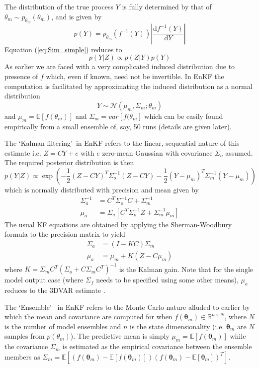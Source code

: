 \documentclass[10pt,a4paper]{article}
\newcommand{\expect} {{\mathbb{E}}}
\newcommand{\thetab} {{\boldsymbol{\theta}}}
\newcommand{\intd} {\textrm{d}}
\begin{document}
\noindent The distribution of the true process $Y$ is fully determined by that of $\theta_m \sim p_{\theta_m}(\theta_m)$, and is given by
\begin{equation}
p(Y) = p_{\theta_m}(f^{-1}(Y))\left| \frac{\intd f^{-1}(Y)}{\intd Y}\right|
\end{equation}
\noindent Equation (\ref{eq:Sim_simple}) reduces to
\begin{equation}
p(Y|Z) \propto  p(Z | Y)p(Y)
\end{equation}
\noindent As earlier we are faced with a very complicated induced distribution due to presence of $f$ which, even if known, need not be invertible. In EnKF the computation is facilitated by approximating the induced distribution as a normal distribution
\begin{equation}
Y \sim \mathcal{N}(\mu_m,\Sigma_m; \theta_m)
\end{equation}
\noindent and $\mu_m = \expect[f(\theta_m)]$ and $\Sigma_m = var[f(\theta_m]$ which can be easily found empirically from a small ensemble of, say, 50 runs (details are given later).  

The \lq Kalman filtering\rq~in EnKF refers to the linear, sequential nature of this estimate i.e. $Z = CY + e$ with $e$ zero-mean Gaussian with covariance $\Sigma_o$ assumed.  The required posterior distribution is then
\begin{equation}
  p(Y | Z) \propto \exp\left(-\frac{1}{2}(Z - CY)^T\Sigma_o^{-1}(Z - CY) - \frac{1}{2}(Y - \mu_m)^T\Sigma_m^{-1}(Y - \mu_m) \right) 
\end{equation}
\noindent which is normally distributed with precision and mean given by
\begin{align}
\Sigma_a^{-1} &= C^T\Sigma_o^{-1}C + \Sigma_m^{-1} \\
\mu_a &= \Sigma_a[C^T\Sigma_o^{-1}Z + \Sigma^{-1}_m\mu_m]
\end{align}
\noindent The usual KF equations are obtained by applying the Sherman-Woodbury formula to the precision matrix to yield
\begin{align}
\Sigma_a &= (I - KC)\Sigma_m \\
\mu_a &= \mu_m + K(Z - C\mu_m) \label{eq:EnKFmean}
\end{align}
\noindent where $K = \Sigma_mC^T(\Sigma_o + C\Sigma_mC^T)^{-1}$ is the Kalman gain. Note that for the single model output case (where $\Sigma_f$ needs to be specified using some other means), $\mu_a$ reduces to the 3DVAR estimate \citep{Hamill_2000}.

The \lq Ensemble\rq~ in EnKF refers to the Monte Carlo nature alluded to earlier by which the mean and covariance are computed for when $f(\thetab_m) \in \mathbb{R}^{n \times N}$, where $N$ is the number of model ensembles and $n$ is the state dimensionality (i.e. $\thetab_m$ are $N$ samples from $p(\theta_m)$). The predictive mean is simply $\mu_m = \expect[f(\thetab_m)]$ while the covariance $\Sigma_m$ is estimated as the empirical covariance between the ensemble members as  $\Sigma_m = \expect[(f(\thetab_m) - \expect[f(\thetab_m)])(f(\thetab_m) - \expect[\thetab_m])^T]$. 
\end{document}

